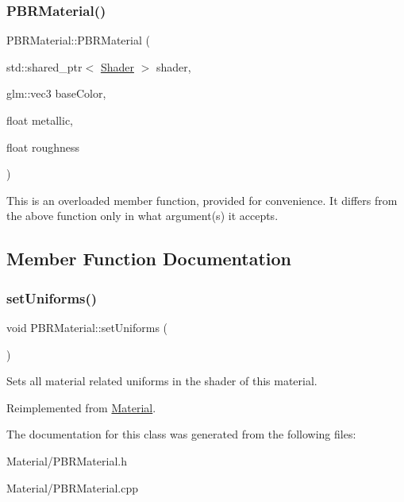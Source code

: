 \subsubsection{\texorpdfstring{PBRMaterial()}{PBRMaterial()}\hspace{0.1cm}{\footnotesize\ttfamily [3/3]}}
{\footnotesize\ttfamily P\+B\+R\+Material\+::\+P\+B\+R\+Material (\begin{DoxyParamCaption}\item[{std\+::shared\+\_\+ptr$<$ \mbox{\hyperlink{class_shader}{Shader}} $>$}]{shader,  }\item[{glm\+::vec3}]{base\+Color,  }\item[{float}]{metallic,  }\item[{float}]{roughness }\end{DoxyParamCaption})}

This is an overloaded member function, provided for convenience. It differs from the above function only in what argument(s) it accepts. 

\subsection{Member Function Documentation}
\mbox{\label{class_p_b_r_material_ae8cabaa3a19fc6787233f2f06b1d058e}} 
\subsubsection{\texorpdfstring{setUniforms()}{setUniforms()}}
{\footnotesize\ttfamily void P\+B\+R\+Material\+::set\+Uniforms (\begin{DoxyParamCaption}{ }\end{DoxyParamCaption})\hspace{0.3cm}{\ttfamily [virtual]}}

Sets all material related uniforms in the shader of this material. 

Reimplemented from \mbox{\hyperlink{class_material_a793da829d1f2daf3f3317d9b495f8b26}{Material}}.



The documentation for this class was generated from the following files\+:\begin{DoxyCompactItemize}
\item 
Material/P\+B\+R\+Material.\+h\item 
Material/P\+B\+R\+Material.\+cpp\end{DoxyCompactItemize}
